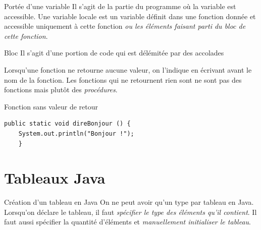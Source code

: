 \documentclass{report}
\begin{document}
\begin{Concept*}{Portée d'une variable}
	Il s'agit de la partie du programme où la variable est accessible. Une variable locale est un variable définit
	dans une fonction donnée et accessible uniquement à cette fonction 
	\textit{ou les éléments faisant parti du bloc de cette fonction}.

\end{Concept*}
	\begin{DefG*}{Bloc}{}
	Il s'agit d'une portion de code qui est délémitée par des accolades 

\end{DefG*}


\noindent Lorsqu'une fonction ne retourne aucune valeur, on l'indique en écrivant 
 avant le nom de la fonction. Les fonctions qui ne retournent rien
sont ne sont pas des fonctions mais plutôt des \textit{procédures}. 

\begin{EExample*}{Fonction sans valeur de retour}{}
\begin{lstlisting}[style=JavaDraculaWhite]
	public static void direBonjour () {
	System.out.println("Bonjour !");
	}
\end{lstlisting}
\end{EExample*}
% 
\section{Tableaux Java}
\begin{Syntaxe*}{Création d'un tableau en Java}{}
	On ne peut avoir qu'un type par tableau en Java. Lorsqu'on déclare le tableau, il faut 
	\textit{spécifier le type des éléments qu'il contient}. Il faut aussi spécifier la quantité 
	d'éléments et \textit{manuellement initialiser le tableau}.
\end{Syntaxe*}
\end{document}
